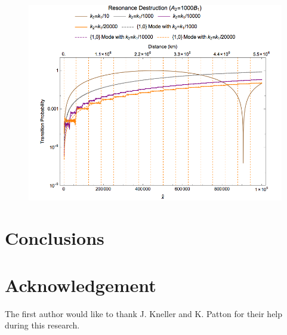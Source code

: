 \documentclass[%
reprint,
 amsmath,amssymb,
 aps,
]{revtex4-1}
\begin{document}
\begin{figure}[!htbp]
                \centering
                \includegraphics[width=\columnwidth]{assets/interference}
                \caption{}
                \label{fig-interference}
\end{figure}



\section{\label{conclusions}Conclusions}






\section{\label{acknowledgement}Acknowledgement}

The first author would like to thank J. Kneller and K. Patton for their help during this research.







\end{document}
